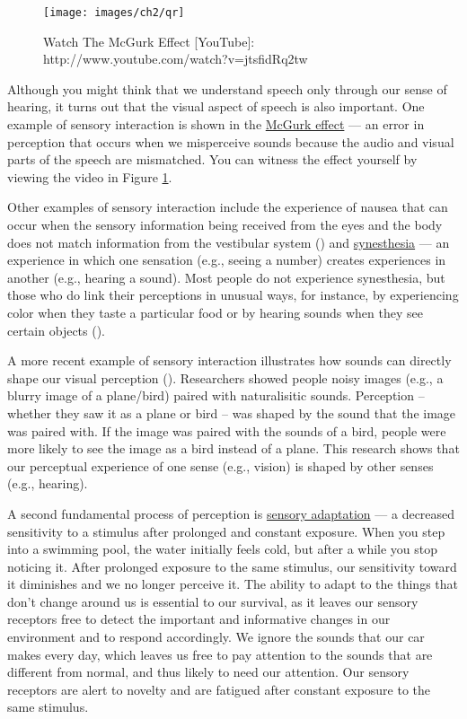 \documentclass[
]{krantz}
\begin{document}
\begin{figure}

{\centering \texttt{[image: images/ch2/qr]} 

}

\caption{Watch The McGurk Effect [YouTube]: http://www.youtube.com/watch?v=jtsfidRq2tw }\label{fig:mcgurk}
\end{figure}

Although you might think that we understand speech only through our sense of hearing, it turns out that the visual aspect of speech is also important. One example of sensory interaction is shown in the \hyperref[mcgurk-effect]{McGurk effect} --- an error in perception that occurs when we misperceive sounds because the audio and visual parts of the speech are mismatched. You can witness the effect yourself by viewing the video in Figure \ref{fig:mcgurk}.

Other examples of sensory interaction include the experience of nausea that can occur when the sensory information being received from the eyes and the body does not match information from the vestibular system () and \hyperref[synesthesia]{synesthesia} --- an experience in which one sensation (e.g., seeing a number) creates experiences in another (e.g., hearing a sound). Most people do not experience synesthesia, but those who do link their perceptions in unusual ways, for instance, by experiencing color when they taste a particular food or by hearing sounds when they see certain objects ().

A more recent example of sensory interaction illustrates how sounds can directly shape our visual perception (). Researchers showed people noisy images (e.g., a blurry image of a plane/bird) paired with naturalisitic sounds. Perception -- whether they saw it as a plane or bird -- was shaped by the sound that the image was paired with. If the image was paired with the sounds of a bird, people were more likely to see the image as a bird instead of a plane. This research shows that our perceptual experience of one sense (e.g., vision) is shaped by other senses (e.g., hearing).

A second fundamental process of perception is \hyperref[sensory-adaptation]{sensory adaptation} --- a decreased sensitivity to a stimulus after prolonged and constant exposure. When you step into a swimming pool, the water initially feels cold, but after a while you stop noticing it. After prolonged exposure to the same stimulus, our sensitivity toward it diminishes and we no longer perceive it. The ability to adapt to the things that don't change around us is essential to our survival, as it leaves our sensory receptors free to detect the important and informative changes in our environment and to respond accordingly. We ignore the sounds that our car makes every day, which leaves us free to pay attention to the sounds that are different from normal, and thus likely to need our attention. Our sensory receptors are alert to novelty and are fatigued after constant exposure to the same stimulus.
\end{document}
